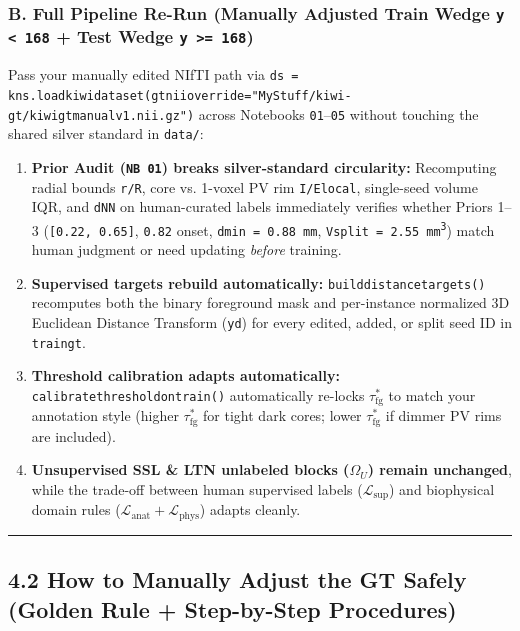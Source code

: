 \documentclass[10pt,a4paper]{article}
\renewcommand{\_}{\origunderscore\allowbreak}
\begin{document}
\subsubsection*{B. Full Pipeline Re-Run (Manually Adjusted Train Wedge \texttt{y < 168} + Test Wedge \texttt{y >= 168})}
Pass your manually edited NIfTI path via \texttt{ds = kns.load\_kiwi\_dataset(gt\_nii\_override="MyStuff/\allowbreak{}kiwi-gt/\allowbreak{}kiwi\_gt\_manual\_v1.nii.gz")} across Notebooks \texttt{01}--\texttt{05} without touching the shared silver standard in \texttt{data/\allowbreak{}}:
\begin{enumerate}
\item \textbf{Prior Audit (\texttt{NB 01}) breaks silver-standard circularity:} Recomputing radial bounds \texttt{r/\allowbreak{}R}, core vs. 1-voxel PV rim \texttt{I/\allowbreak{}E\_local}, single-seed volume IQR, and \texttt{d\_NN} on human-curated labels immediately verifies whether Priors 1--3 (\texttt{[0.22, 0.65]}, \texttt{0.82} onset, \texttt{d\_min = 0.88 mm}, \texttt{V\_split = 2.55 mm\textsuperscript{3}}) match human judgment or need updating \textit{before} training.
\item \textbf{Supervised targets rebuild automatically:} \texttt{build\_distance\_targets()} recomputes both the binary foreground mask and per-instance normalized 3D Euclidean Distance Transform (\texttt{y\_d}) for every edited, added, or split seed ID in \texttt{train\_gt}.
\item \textbf{Threshold calibration adapts automatically:} \texttt{calibrate\_threshold\_on\_train()} automatically re-locks $\tau_{\text{fg}}^*$ to match your annotation style (higher $\tau_{\text{fg}}^*$ for tight dark cores; lower $\tau_{\text{fg}}^*$ if dimmer PV rims are included).
\item \textbf{Unsupervised SSL \& LTN unlabeled blocks ($\Omega_U$) remain unchanged}, while the trade-off between human supervised labels ($\mathcal{L}_{\text{sup}}$) and biophysical domain rules ($\mathcal{L}_{\text{anat}} + \mathcal{L}_{\text{phys}}$) adapts cleanly.
\end{enumerate}

\vspace{0.25em}\noindent\textcolor{uibblue!25}{\rule{\linewidth}{0.4pt}}\vspace{0.25em}

\subsection*{4.2 How to Manually Adjust the GT Safely (Golden Rule + Step-by-Step Procedures)}
\end{document}
